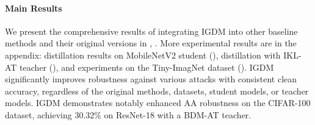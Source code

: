 \documentclass{article} %
\begin{document}
\paragraph{Main Results}
We present the comprehensive results of integrating IGDM into other baseline methods and their original versions in , .
More experimental results are in the appendix: distillation results on MobileNetV2 student (), distillation with IKL-AT teacher (), and experiments on the Tiny-ImagNet dataset ().
IGDM significantly improves robustness against various attacks with consistent clean accuracy, regardless of the original methods, datasets, student models, or teacher models.
IGDM demonstrates notably enhanced AA robustness on the CIFAR-100 dataset, achieving 30.32\% on ResNet-18 with a BDM-AT teacher.

\end{document}
